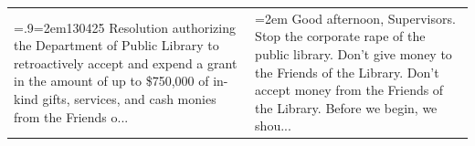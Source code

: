 \documentclass[11pt]{article}
\begin{document}
\begin{table}[t]
\begin{tabularx}{\linewidth}{>{\hsize=.9\hsize \hangindent=2em}X>{\hsize=1.1\hsize \hangindent=2em}X}
130425 Resolution authorizing the Department of Public Library to retroactively accept and expend a grant in the amount of up to \$750,000 of in-kind gifts, services, and cash monies from the Friends o... & Good afternoon, Supervisors. Stop the corporate rape of the public library. Don't give money to the Friends of the Library. Don't accept money from the Friends of the Library. Before we begin, we shou... \\

\end{tabularx}
\end{table}
\end{document}
